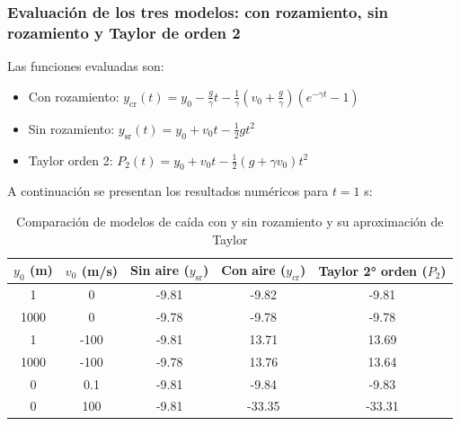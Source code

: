 \documentclass{article}
\begin{document}
\subsubsection{Evaluación de los tres modelos: con rozamiento, sin rozamiento y Taylor de orden 2}

Las funciones evaluadas son:
\begin{itemize}
    \item Con rozamiento: $y_{\text{cr}}(t) = y_0 - \frac{g}{\gamma}t - \frac{1}{\gamma}(v_0 + \frac{g}{\gamma})(e^{-\gamma t} - 1)$
    \item Sin rozamiento: $y_{\text{sr}}(t) = y_0 + v_0t - \frac{1}{2}gt^2$
    \item Taylor orden 2: $P_2(t) = y_0 + v_0t - \frac{1}{2}(g + \gamma v_0)t^2$
\end{itemize}

A continuación se presentan los resultados numéricos para $t = 1$ s:

\begin{table}[H]
\centering
\begin{tabular}{|c|c||c|c|c|}
\hline
$y_0$ (m) & $v_0$ (m/s) & Sin aire ($y_{\text{sr}}$) & Con aire ($y_{\text{cr}}$) & Taylor 2° orden ($P_2$) \\
\hline
1         & 0           & -9.81                      & -9.82                      & -9.81 \\
1000      & 0           & -9.78                      & -9.78                      & -9.78 \\
1         & -100        & -9.81                    & 13.71                    & 13.69 \\
1000      & -100        & -9.78                    & 13.76                    & 13.64 \\
0         & 0.1         & -9.81                      & -9.84                      & -9.83 \\
0         & 100         & -9.81                      & -33.35                     & -33.31 \\
\hline
\end{tabular}
\caption{Comparación de modelos de caída con y sin rozamiento y su aproximación de Taylor}
\end{table}
\end{document}
